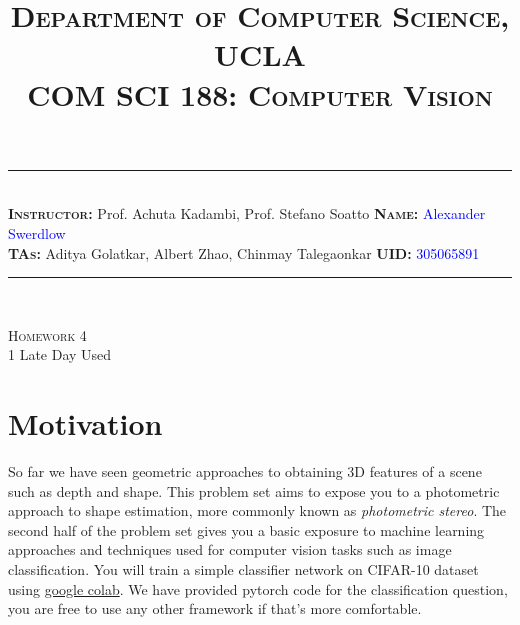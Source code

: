 \documentclass[answers]{exam}
\title{\normalfont \normalsize
\textsc{{Department of Computer Science, UCLA \\
COM SCI 188: Computer Vision}}
\date{\vspace{-12ex}}
}
\newcommand{\myinput}[1]{\textcolor{blue}{#1}}
\begin{document}
\maketitle
\rule{\linewidth}{0.8pt} \\[6pt] 
\noindent
\large\textbf{\textsc{Instructor:}} Prof. Achuta Kadambi, Prof. Stefano Soatto \hfill \large\textbf{\textsc{Name:}} \myinput{Alexander Swerdlow}\\
\large\textbf{\textsc{TAs:}} Aditya Golatkar, Albert Zhao, Chinmay Talegaonkar \hfill 
\large\textbf{\textsc{UID:}} \myinput{305065891}
\rule{\linewidth}{0.8pt} \\[6pt] 

\begin{center}
{\textsc{Homework 4}}\\
1 Late Day Used
\end{center}


\begin{table}[h]
\centering
{}
\caption*{}
\label{}
\end{table}
\section*{Motivation}
So far we have seen geometric approaches to obtaining 3D features of a scene such as depth and shape. This problem set aims to expose you to a photometric approach to shape estimation, more commonly known as \textit{photometric stereo}. The second half of the problem set gives you a basic exposure to machine learning approaches and techniques used for computer vision tasks such as image classification. You will train a simple classifier network on CIFAR-10 dataset using \href{https://colab.research.google.com/notebooks/intro.ipynb#recent=true}{google colab}. We have provided pytorch code for the classification question, you are free to use any other framework if that's more comfortable.  
\end{document}
